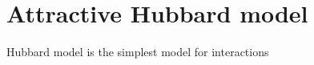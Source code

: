 \documentclass[../main.tex]{subfiles}
\begin{document}
\chapter{Attractive Hubbard model}

Hubbard model is the simplest model for interactions

\cite{qinHubbardModelComputational2022}



\cite{micnasSuperconductivityNarrowbandSystems1990}

\end{document}
